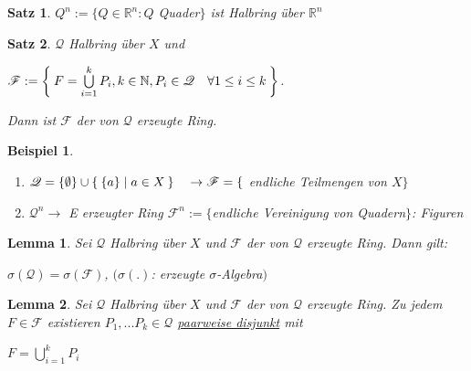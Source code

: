\documentclass[11pt]{memoir}
\theoremstyle{changebreak}
\newtheorem{Beispiel}{Beispiel}[chapter]
\newtheorem{Lemma}{Lemma}[chapter]
\newtheorem{Satz}{Satz}[chapter]
\begin{document}
\begin{Satz}
$Q^n := \{Q \in \mathbb R^n: Q $ Quader$\}$ ist Halbring über $\mathbb R^n$
\end{Satz}

\begin{Satz}
$\mathscr Q$ Halbring über $X$ und 
\begin{center}
	$\mathscr F := \Set{F = \bigcup\limits_{i=1}^k P_i, k \in \mathbb N, P_i \in \mathscr Q \quad \forall 1 \leq i \leq k}$. 
\end{center}	
Dann ist $\mathscr F$ der von $\mathscr Q$ erzeugte Ring.
\end{Satz}

\begin{Beispiel}
\begin{enumerate}
	\item $\mathscr Q = \{\emptyset \} \cup \Set{\{a\}| a \in X} \quad \rightarrow \mathscr F = \{$ endliche Teilmengen von $X\}$
	\item $\mathscr Q^n \rightarrow$ E erzeugter Ring $\mathscr F^n:= \{$endliche Vereinigung von Quadern$\}$: Figuren
\end{enumerate}
\end{Beispiel}

\begin{Lemma}
Sei $\mathscr Q$ Halbring über $X$ und $\mathscr F$ der von $\mathscr Q$ erzeugte Ring. Dann gilt: 
\begin{center}
	$\sigma(\mathscr Q) = \sigma(\mathscr F)$, \quad $(\sigma(.)$: erzeugte $\sigma$-Algebra$)$
\end{center}
\end{Lemma}

\begin{Lemma}
Sei $\mathscr Q$ Halbring über $X$ und $\mathscr F$ der von $\mathscr Q$ erzeugte Ring. Zu jedem $F \in \mathscr F$ existieren $P_1, ... P_k \in \mathscr Q$ \underline{paarweise disjunkt} mit 
\begin{center}
	$F = \bigcup\limits_{i=1}^k P_i$
\end{center}
\end{Lemma}
\end{document}
